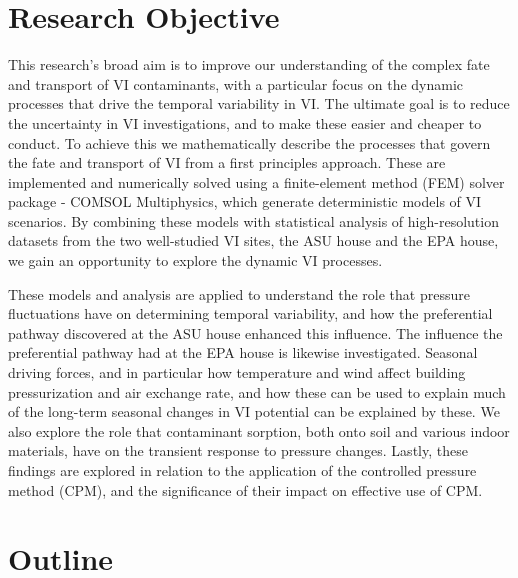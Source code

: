 \documentclass[../thesis.tex]{subfiles}
\begin{document}






\section{Research Objective}

This research's broad aim is to improve our understanding of the complex fate and transport of VI contaminants, with a particular focus on the dynamic processes that drive the temporal variability in VI.
The ultimate goal is to reduce the uncertainty in VI investigations, and to make these easier and cheaper to conduct.
To achieve this we mathematically describe the processes that govern the fate and transport of VI from a first principles approach.
These are implemented and numerically solved using a finite-element method (FEM) solver package - COMSOL Multiphysics, which generate deterministic models of VI scenarios.
By combining these models with statistical analysis of high-resolution datasets from the two well-studied VI sites, the ASU house and the EPA house, we gain an opportunity to explore the dynamic VI processes.\par

These models and analysis are applied to understand the role that pressure fluctuations have on determining temporal variability, and how the preferential pathway discovered at the ASU house enhanced this influence.
The influence the preferential pathway had at the EPA house is likewise investigated.
Seasonal driving forces, and in particular how temperature and wind affect building pressurization and air exchange rate, and how these can be used to explain much of the long-term seasonal changes in VI potential can be explained by these.
We also explore the role that contaminant sorption, both onto soil and various indoor materials, have on the transient response to pressure changes.
Lastly, these findings are explored in relation to the application of the controlled pressure method (CPM), and the significance of their impact on effective use of CPM.\par

\section{Outline}




\end{document}
